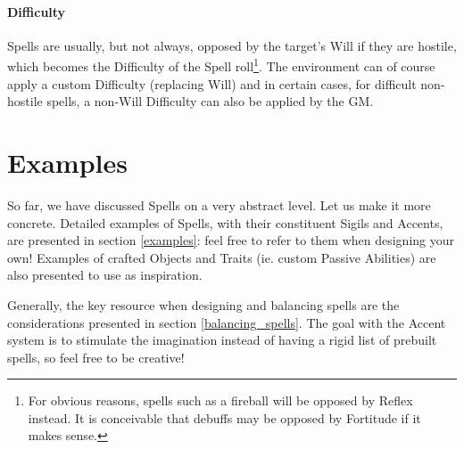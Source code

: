 \paragraph{Difficulty}

Spells are usually, but not always, opposed by the target's Will if they are hostile, which becomes the Difficulty of the Spell roll\footnote{For obvious reasons, spells such as a fireball will be opposed by Reflex instead. It is conceivable that debuffs may be opposed by Fortitude if it makes sense.}. The environment can of course apply a custom Difficulty (replacing Will) and in certain cases, for difficult non-hostile spells, a non-Will Difficulty can also be applied by the GM.

\section{Examples}

So far, we have discussed Spells on a very abstract level. Let us make it more concrete. Detailed examples of Spells, with their constituent Sigils and Accents, are presented in section \ref{examples}: feel free to refer to them when designing your own! Examples of crafted Objects and Traits (ie. custom Passive Abilities) are also presented to use as inspiration.

Generally, the key resource when designing and balancing spells are the considerations presented in section \ref{balancing_spells}. The goal with the Accent system is to stimulate the imagination instead of having a rigid list of prebuilt spells, so feel free to be creative!














